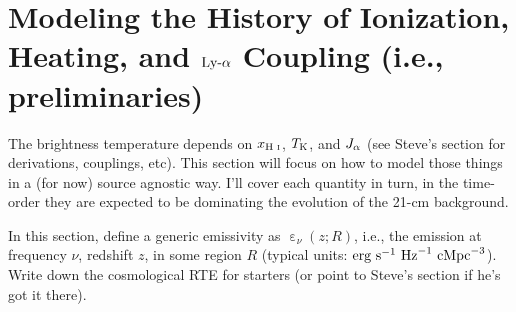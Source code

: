 \documentclass[letterpaper,titlepage,12pt]{article}
\begin{document}
\section{Modeling the History of Ionization, Heating, and $\text{Ly-}\alpha$ Coupling (i.e., preliminaries)} \vspace{-12pt}
The brightness temperature depends on $x_{\text{H } \textsc{i}}$, $T_{\text{K}}$, and $J_{\alpha}$ (see Steve's section for derivations, couplings, etc). This section will focus on how to model those things in a (for now) source agnostic way. I'll cover each quantity in turn, in the time-order they are expected to be dominating the evolution of the 21-cm background. 

In this section, define a generic emissivity as $\upepsilon_{\nu}(z; R)$, i.e., the emission at frequency $\nu$, redshift $z$, in some region $R$ (typical units: $\text{erg} \ \text{s}^{-1} \ \text{Hz}^{-1} \ \text{cMpc}^{-3}$). Write down the cosmological RTE for starters (or point to Steve's section if he's got it there). 
\end{document}
